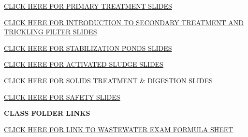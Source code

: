 \documentclass{article}
\begin{document}
\begin{tcolorbox}[width=17cm,box align=center, halign=center,  valign=center,colback={my-blue},title={}, colbacktitle=yellow,coltitle=blue]    
\href{https://sbasrai.github.io/Primary_Treatment/}{CLICK HERE FOR PRIMARY TREATMENT SLIDES}
\end{tcolorbox} 

\begin{tcolorbox}[width=17cm,box align=center, halign=center,  valign=center,colback={my-blue},title={}, colbacktitle=yellow,coltitle=blue]    
\href{https://sbasrai.github.io/IntroductiontoSecondaryTreatmentandTricklingFilters/}{CLICK HERE FOR INTRODUCTION TO SECONDARY TREATMENT AND TRICKLING FILTER SLIDES}
\end{tcolorbox}

\begin{tcolorbox}[width=17cm,box align=center, halign=center,  valign=center,colback={my-blue},title={}, colbacktitle=yellow,coltitle=blue]    
\href{https://sbasrai.github.io/Stabilization_Ponds/}{CLICK HERE FOR STABILIZATION PONDS SLIDES}
\end{tcolorbox}

\begin{tcolorbox}[width=17cm,box align=center, halign=center,  valign=center,colback={my-blue},title={}, colbacktitle=yellow,coltitle=blue]    
\href{https://sbasrai.github.io/Activated_Sludge_Revised/}{CLICK HERE FOR ACTIVATED SLUDGE SLIDES}
\end{tcolorbox} 

\begin{tcolorbox}[width=17cm,box align=center, halign=center,  valign=center,colback={my-blue},title={}, colbacktitle=yellow,coltitle=blue]    
\href{https://sbasrai.github.io/Solids_Treatment_and_Digestion/}{CLICK HERE FOR SOLIDS TREATMENT \& DIGESTION  SLIDES}
\end{tcolorbox} 

\begin{tcolorbox}[width=17cm,box align=center, halign=center,  valign=center,colback={my-blue},title={}, colbacktitle=yellow,coltitle=blue]    
\href{https://sbasrai.github.io/Safety/}{CLICK HERE FOR SAFETY SLIDES}
\end{tcolorbox} 

\newpage

\textbf{CLASS FOLDER LINKS}

\begin{tcolorbox}[width=17cm,box align=center, halign=center,  valign=center,colback={my-blue},title={}, colbacktitle=yellow,coltitle=blue]    
\href{https://drive.google.com/file/d/1BPez25mIjKvVi5f9bCbC5TUVdUvlnsaC/view?usp=sharing}{CLICK HERE FOR LINK TO WASTEWATER EXAM FORMULA SHEET}
\end{tcolorbox}
\end{document}
